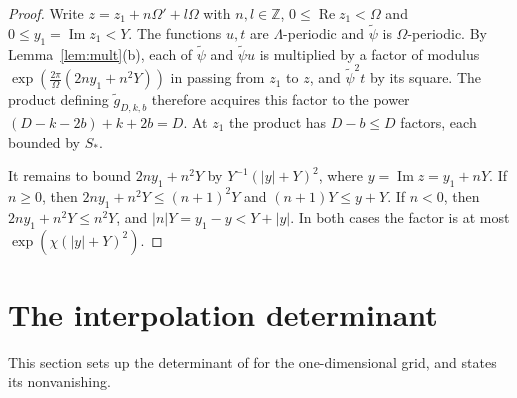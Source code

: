\documentclass[11pt]{amsart}
\theoremstyle{definition}
\theoremstyle{remark}
\numberwithin{equation}{section}
\newcommand{\Z}{\mathbb Z}
\newcommand{\tpsi}{\widetilde\psi}
\newcommand{\tg}{\widetilde g}
\newcommand{\CM}{\cite{ChudnovskyChudnovsky26}}
\begin{document}
\begin{proof}
Write $z=z_1+n\Omega'+l\Omega$ with $n,l\in\Z$, $0\le\operatorname{Re}z_1<\Omega$ and
$0\le y_1=\operatorname{Im}z_1<Y$. The functions $u,t$ are $\Lambda$-periodic and $\tpsi$ is
$\Omega$-periodic. By Lemma~\ref{lem:mult}(b), each of $\tpsi$ and $\tpsi u$ is multiplied by a factor of
modulus $\exp(\tfrac{2\pi}\Omega(2ny_1+n^2Y))$ in passing from $z_1$ to $z$, and $\tpsi^2t$ by its square. The
product defining $\tg_{D,k,b}$ therefore acquires this factor to the power $(D-k-2b)+k+2b=D$. At $z_1$ the
product has $D-b\le D$ factors, each bounded by $S_*$.

It remains to bound $2ny_1+n^2Y$ by $Y^{-1}(|y|+Y)^2$, where $y=\operatorname{Im}z=y_1+nY$. If $n\ge0$, then
$2ny_1+n^2Y\le(n+1)^2Y$ and $(n+1)Y\le y+Y$. If $n<0$, then $2ny_1+n^2Y\le n^2Y$, and
$|n|Y=y_1-y<Y+|y|$. In both cases the factor is at most $\exp(\chi(|y|+Y)^2)$.
\end{proof}

\section{The interpolation determinant}\label{sec:det}

This section sets up the determinant of \CM{} for the one-dimensional grid, and states its nonvanishing.
\end{document}

